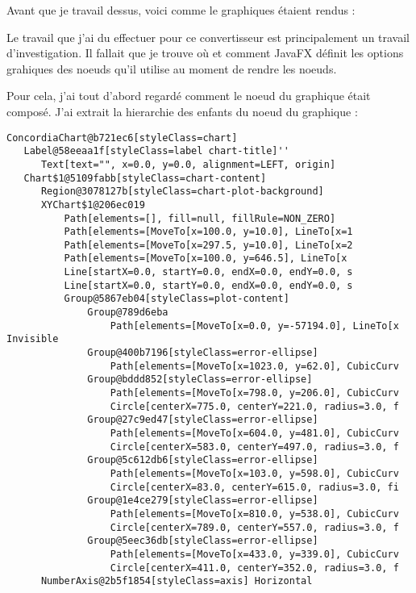 Avant que je travail dessus, voici comme le graphiques étaient rendus :

Le travail que j'ai du effectuer pour ce convertisseur est principalement un travail d'investigation. Il fallait que je trouve où et comment JavaFX définit les options grahiques des noeuds qu'il utilise au moment de rendre les noeuds.

Pour cela, j'ai tout d'abord regardé comment le noeud du graphique était composé. J'ai extrait la hierarchie des enfants du noeud du graphique :

\begin{verbatim}
ConcordiaChart@b721ec6[styleClass=chart]
   Label@58eeaa1f[styleClass=label chart-title]''
      Text[text="", x=0.0, y=0.0, alignment=LEFT, origin]
   Chart$1@5109fabb[styleClass=chart-content]
      Region@3078127b[styleClass=chart-plot-background]
      XYChart$1@206ec019
          Path[elements=[], fill=null, fillRule=NON_ZERO]
          Path[elements=[MoveTo[x=100.0, y=10.0], LineTo[x=1 
          Path[elements=[MoveTo[x=297.5, y=10.0], LineTo[x=2
          Path[elements=[MoveTo[x=100.0, y=646.5], LineTo[x 
          Line[startX=0.0, startY=0.0, endX=0.0, endY=0.0, s 
          Line[startX=0.0, startY=0.0, endX=0.0, endY=0.0, s
          Group@5867eb04[styleClass=plot-content]
              Group@789d6eba
                  Path[elements=[MoveTo[x=0.0, y=-57194.0], LineTo[x Invisible
              Group@400b7196[styleClass=error-ellipse]
                  Path[elements=[MoveTo[x=1023.0, y=62.0], CubicCurv
              Group@bddd852[styleClass=error-ellipse]
                  Path[elements=[MoveTo[x=798.0, y=206.0], CubicCurv
                  Circle[centerX=775.0, centerY=221.0, radius=3.0, f
              Group@27c9ed47[styleClass=error-ellipse]
                  Path[elements=[MoveTo[x=604.0, y=481.0], CubicCurv
                  Circle[centerX=583.0, centerY=497.0, radius=3.0, f
              Group@5c612db6[styleClass=error-ellipse]
                  Path[elements=[MoveTo[x=103.0, y=598.0], CubicCurv
                  Circle[centerX=83.0, centerY=615.0, radius=3.0, fi
              Group@1e4ce279[styleClass=error-ellipse]
                  Path[elements=[MoveTo[x=810.0, y=538.0], CubicCurv
                  Circle[centerX=789.0, centerY=557.0, radius=3.0, f
              Group@5eec36db[styleClass=error-ellipse]
                  Path[elements=[MoveTo[x=433.0, y=339.0], CubicCurv
                  Circle[centerX=411.0, centerY=352.0, radius=3.0, f
      NumberAxis@2b5f1854[styleClass=axis] Horizontal 

\end{verbatim}
